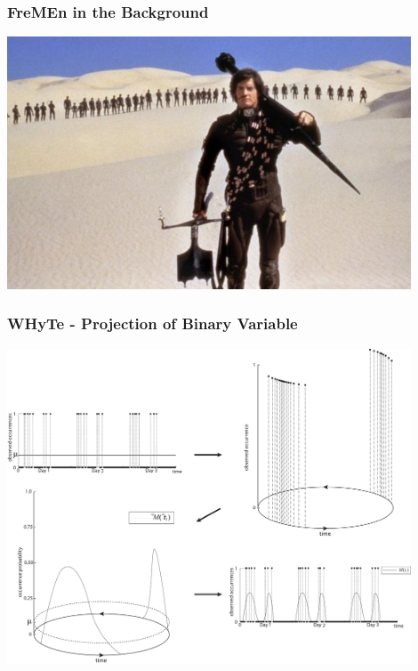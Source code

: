 
\begin{frame}
	\frametitle{FreMEn in the Background}
    \vspace{3mm}
    \href{run:./video/pitch.mkv}{\includegraphics[width=0.9\textwidth]{fig/fremen_backgroung.jpeg}}
\end{frame}



\begin{frame}
	\frametitle{WHyTe - Projection of Binary Variable}
    \vspace{3mm}
            \includegraphics[width=0.9\textwidth]{fig/hypertime_graphs_a.pdf}
\end{frame}



